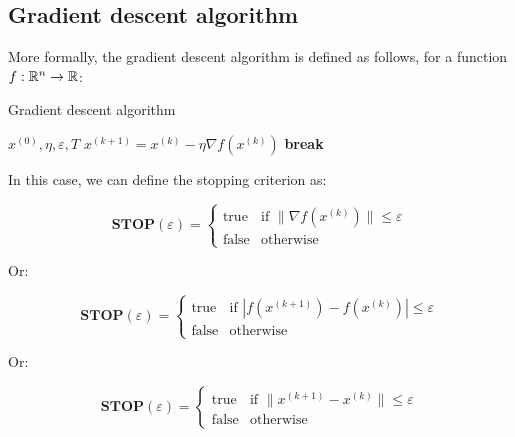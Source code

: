 \subsection{Gradient descent algorithm}

More formally, the gradient descent algorithm is defined as follows, for a function
$f: \mathbb{R}^n \rightarrow \mathbb{R}$:

\begin{algorithm}[H]
    \caption{Gradient descent algorithm}
    \begin{algorithmic}[1]
        \Require $x^{(0)}, \eta, \varepsilon, T$
            \State $x^{(k+1)} = x^{(k)} - \eta \nabla f(x^{(k)})$
                \State \textbf{break}
            \EndIf
        \EndFor
    \end{algorithmic}
\end{algorithm}

In this case, we can define the stopping criterion as:

\begin{equation}
    \textbf{STOP}(\varepsilon) = \left\{ \begin{array}{ll}
        \text{true} & \text{if } \| \nabla f(x^{(k)}) \| \leq \varepsilon\\
        \text{false} & \text{otherwise}
    \end{array} \right.
\end{equation}

Or:

\begin{equation}
    \textbf{STOP}(\varepsilon) = \left\{ \begin{array}{ll}
        \text{true} & \text{if } |f(x^{(k+1)}) - f(x^{(k)})| \leq \varepsilon\\
        \text{false} & \text{otherwise}
    \end{array} \right.
\end{equation}

Or:

\begin{equation}
    \textbf{STOP}(\varepsilon) = \left\{ \begin{array}{ll}
        \text{true} & \text{if } \| x^{(k+1)} - x^{(k)} \| \leq \varepsilon\\
        \text{false} & \text{otherwise}
    \end{array} \right.
\end{equation}

